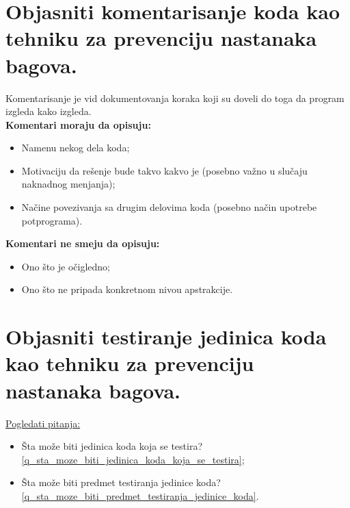 \documentclass[a4paper]{article}
\begin{document}
\section{Objasniti komentarisanje koda kao tehniku za prevenciju nastanaka bagova.}
  Komentarisanje je vid dokumentovanja koraka koji su doveli do toga da program izgleda
  kako izgleda. \\
  \noindent \textbf{Komentari moraju da opisuju:}
  \begin{itemize}
    \item Namenu nekog dela koda;
    \item Motivaciju da rešenje bude takvo kakvo je (posebno važno u slučaju naknadnog menjanja);
    \item Načine povezivanja sa drugim delovima koda (posebno način upotrebe potprograma).
  \end{itemize}
  \textbf{Komentari ne smeju da opisuju:}
  \begin{itemize}
    \item Ono što je očigledno;
    \item Ono što ne pripada konkretnom nivou apstrakcije.
  \end{itemize}

\section{Objasniti testiranje jedinica koda kao tehniku za prevenciju nastanaka bagova.}
  \noindent \underline{Pogledati pitanja:} 
  \begin{itemize}
    \item Šta može biti jedinica koda koja se testira? 
          \ref{q_sta_moze_biti_jedinica_koda_koja_se_testira};
    \item Šta može biti predmet testiranja jedinice koda? 
          \ref{q_sta_moze_biti_predmet_testiranja_jedinice_koda}.
  \end{itemize}
\end{document}
